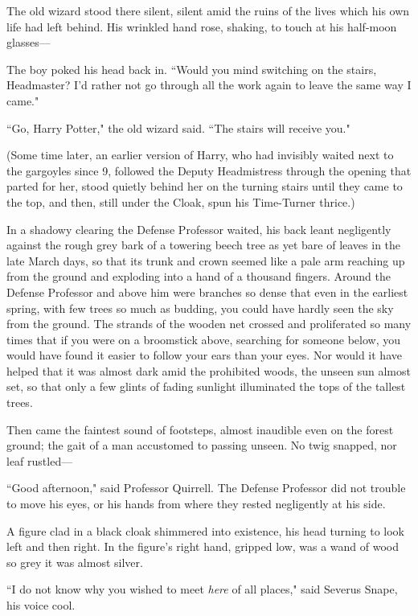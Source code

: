 The old wizard stood there silent, silent amid the ruins of the lives which his own life had left behind. His wrinkled hand rose, shaking, to touch at his half-moon glasses—

The boy poked his head back in. ``Would you mind switching on the stairs, Headmaster? I'd rather not go through all the work again to leave the same way I came."

``Go, Harry Potter," the old wizard said. ``The stairs will receive you."

(Some time later, an earlier version of Harry, who had invisibly waited next to the gargoyles since 9\pm, followed the Deputy Headmistress through the opening that parted for her, stood quietly behind her on the turning stairs until they came to the top, and then, still under the Cloak, spun his Time-Turner thrice.)


In a shadowy clearing the Defense Professor waited, his back leant negligently against the rough grey bark of a towering beech tree as yet bare of leaves in the late March days, so that its trunk and crown seemed like a pale arm reaching up from the ground and exploding into a hand of a thousand fingers. Around the Defense Professor and above him were branches so dense that even in the earliest spring, with few trees so much as budding, you could have hardly seen the sky from the ground. The strands of the wooden net crossed and proliferated so many times that if you were on a broomstick above, searching for someone below, you would have found it easier to follow your ears than your eyes. Nor would it have helped that it was almost dark amid the prohibited woods, the unseen sun almost set, so that only a few glints of fading sunlight illuminated the tops of the tallest trees.

Then came the faintest sound of footsteps, almost inaudible even on the forest ground; the gait of a man accustomed to passing unseen. No twig snapped, nor leaf rustled—

``Good afternoon," said Professor Quirrell. The Defense Professor did not trouble to move his eyes, or his hands from where they rested negligently at his side.

A figure clad in a black cloak shimmered into existence, his head turning to look left and then right. In the figure's right hand, gripped low, was a wand of wood so grey it was almost silver.

``I do not know why you wished to meet \emph{here} of all places," said Severus Snape, his voice cool.

